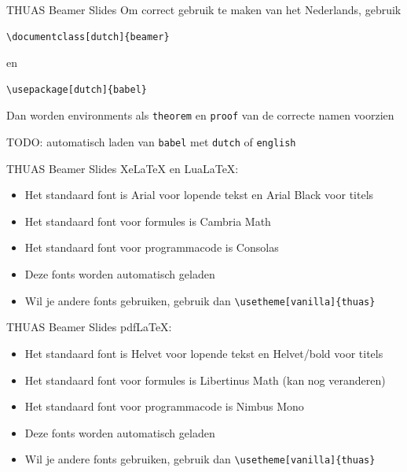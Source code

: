 \documentclass[fleqn,aspectratio=169,dutch]{beamer}
\begin{document}
\begin{frame}[fragile]{THUAS Beamer Slides}
Om correct gebruik te maken van het Nederlands, gebruik
\begin{lstlisting}
\documentclass[dutch]{beamer}
\end{lstlisting}
en
\begin{lstlisting}
\usepackage[dutch]{babel}
\end{lstlisting}
Dan worden environments als \lstinline|theorem| en \lstinline|proof| van de correcte namen voorzien

\alert{TODO}: automatisch laden van \lstinline|babel| met \lstinline|dutch| of \lstinline|english|
\end{frame}

\begin{frame}[fragile]{THUAS Beamer Slides}
Xe\LaTeX{} en Lua\LaTeX:
\begin{itemize}
\item Het standaard font is Arial voor lopende tekst en Arial Black voor titels
\item Het standaard font voor formules is Cambria Math
\item Het standaard font voor programmacode is Consolas
\item Deze fonts worden automatisch geladen
\item Wil je andere fonts gebruiken, gebruik dan \lstinline|\usetheme[vanilla]{thuas}|
\end{itemize}
\end{frame}

\begin{frame}[fragile]{THUAS Beamer Slides}
pdf\LaTeX{}:
\begin{itemize}
\item Het standaard font is Helvet voor lopende tekst en Helvet/bold voor titels
\item Het standaard font voor formules is Libertinus Math (\alert{kan nog veranderen})
\item Het standaard font voor programmacode is Nimbus Mono
\item Deze fonts worden automatisch geladen
\item Wil je andere fonts gebruiken, gebruik dan \lstinline|\usetheme[vanilla]{thuas}|
\end{itemize}
\end{frame}
\end{document}

